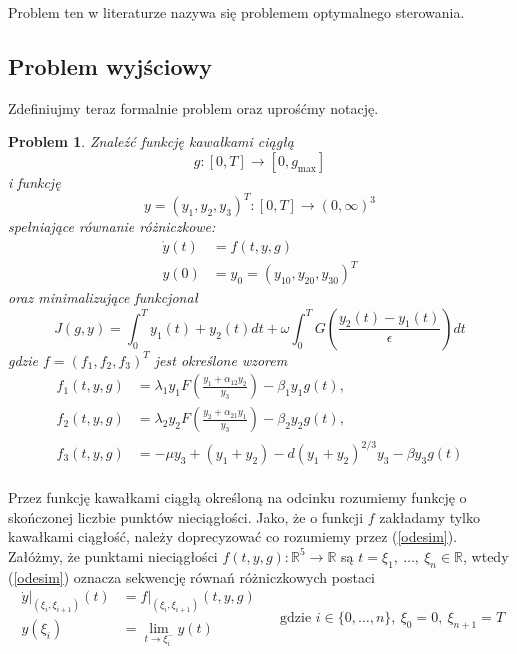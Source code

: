 \documentclass[11pt]{article}
\def\R{\mathbb{R}}
\newtheorem{problem}{Problem}
\begin{document}
Problem ten w literaturze nazywa się problemem optymalnego sterowania.

\subsection{Problem wyjściowy}
Zdefiniujmy teraz formalnie problem oraz uprośćmy notację.

\begin{problem}\label{problem}
  Znaleźć funkcję kawałkami ciągłą
  \[g: [0, T] \to [0, g_{\max}]\]
  i funkcję
  \[y = {(y_1, y_2, y_3)}^T: [0,T] \to {(0, \infty)}^3\]
  spełniające równanie różniczkowe:
  \begin{equation}\label{odesim}
    \begin{aligned}
      \dot{y}(t) &= f(t, y, g) \\
      y(0) &= y_0 = {(y_{10}, y_{20}, y_{30})}^T
    \end{aligned}
  \end{equation}
  oraz minimalizujące funkcjonał
  \begin{equation}\label{objfsim}
    J(g, y) = \int_0^T y_1(t) + y_2(t)dt + \omega\int_0^T G\left(\frac{y_2(t) - y_1(t)}{\epsilon}\right) dt
  \end{equation}
  gdzie $f = {(f_1, f_2, f_3)}^T$ jest określone wzorem
  \begin{equation}\label{dynamicsim}
    \begin{aligned}
      f_1(t, y, g) &= \lambda_1y_1F\left(\frac{y_1 + \alpha_{12}y_2}{y_3}\right) - \beta_1y_1g(t), \\
      f_2(t, y, g) &= \lambda_2y_2F\left(\frac{y_2 + \alpha_{21}y_1}{y_3}\right) - \beta_2y_2g(t), \\
      f_3(t, y, g) &= -\mu y_3 + (y_1+y_2) - d{(y_1 + y_2)}^{2/3}y_3 - \beta y_3 g(t) \\
    \end{aligned}
  \end{equation}
\end{problem}

Przez funkcję kawałkami ciągłą określoną na odcinku rozumiemy funkcję o skończonej liczbie punktów nieciągłości. Jako, że o funkcji $f$ zakładamy tylko kawałkami ciągłość, należy doprecyzować co rozumiemy przez (\ref{odesim}). Załóżmy, że punktami nieciągłości $f(t,y,g): \R^5 \to \R$ są $t = \xi_1,\ \ldots,\ \xi_n \in \R$, wtedy (\ref{odesim}) oznacza sekwencję równań różniczkowych postaci
\begin{equation}\label{nonconode}
  \begin{aligned}
    \dot{y}|_{(\xi_i, \xi_{i+1})}(t) &= f|_{(\xi_i, \xi_{i+1})}(t, y, g)\\
    y(\xi_i) &= \lim_{t\to \xi_i^-}y(t)
  \end{aligned}
  \quad \text{ gdzie } i \in \{0,\ldots, n\},\ \xi_0 = 0,\ \xi_{n+1}=T
\end{equation}
\end{document}
